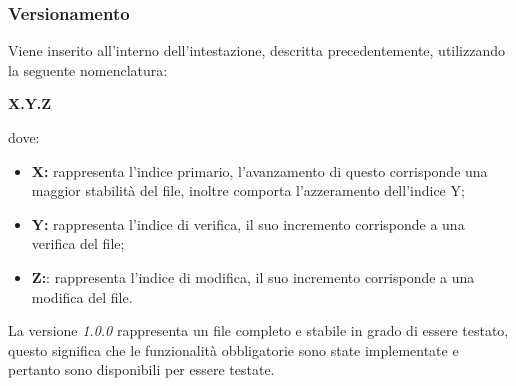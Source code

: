 \subsubsection{Versionamento}
Viene inserito all'interno dell'intestazione, descritta precedentemente, utilizzando la seguente nomenclatura:
\begin{center}
	\textbf{X.Y.Z}
\end{center}
dove:
\begin{itemize}
	\item \textbf{X:} rappresenta l'indice primario, l'avanzamento di questo corrisponde una maggior stabilità del file, inoltre comporta l'azzeramento dell'indice Y;
	\item \textbf{Y:} rappresenta l'indice di verifica, il suo incremento corrisponde a una verifica del file;
	\item \textbf{Z:}: rappresenta l'indice di modifica, il suo incremento corrisponde a una modifica del file.
\end{itemize}
La versione \textit{1.0.0} rappresenta un file completo e stabile in grado di essere testato, questo significa che le funzionalità obbligatorie sono state implementate e pertanto sono disponibili per essere testate.





